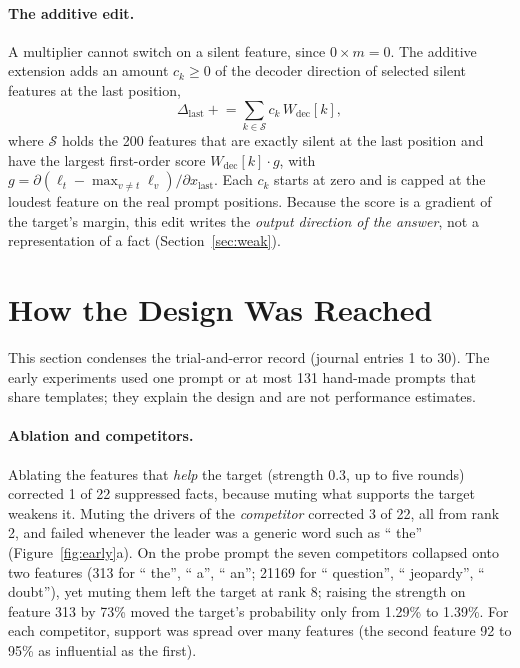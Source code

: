 \documentclass[11pt,twocolumn]{article}
\newcommand{\Wdec}{W_{\mathrm{dec}}}
\begin{document}
\paragraph{The additive edit.} A multiplier cannot switch on a silent feature, since $0\times m=0$. The additive extension adds an amount $c_k\ge 0$ of the decoder direction of selected silent features at the last position,
\begin{equation}\label{eq:add}
\Delta_{\text{last}}\mathrel{+}=\sum_{k\in\mathcal{S}}c_k\,\Wdec[k],
\end{equation}
where $\mathcal{S}$ holds the 200 features that are exactly silent at the last position and have the largest first-order score $\Wdec[k]\cdot g$, with $g=\partial(\ell_t-\max_{v\ne t}\ell_v)/\partial x_{\mathrm{last}}$. Each $c_k$ starts at zero and is capped at the loudest feature on the real prompt positions. Because the score is a gradient of the target's margin, this edit writes the \emph{output direction of the answer}, not a representation of a fact (Section~\ref{sec:weak}).

\section{How the Design Was Reached}
\label{sec:evolution}

This section condenses the trial-and-error record (journal entries 1 to 30). The early experiments used one prompt or at most 131 hand-made prompts that share templates; they explain the design and are not performance estimates.

\paragraph{Ablation and competitors.} Ablating the features that \emph{help} the target (strength 0.3, up to five rounds) corrected 1 of 22 suppressed facts, because muting what supports the target weakens it. Muting the drivers of the \emph{competitor} corrected 3 of 22, all from rank 2, and failed whenever the leader was a generic word such as `` the'' (Figure~\ref{fig:early}a). On the probe prompt the seven competitors collapsed onto two features (313 for `` the'', `` a'', `` an''; 21169 for `` question'', `` jeopardy'', `` doubt''), yet muting them left the target at rank 8; raising the strength on feature 313 by 73\% moved the target's probability only from 1.29\% to 1.39\%. For each competitor, support was spread over many features (the second feature 92 to 95\% as influential as the first).
\end{document}
